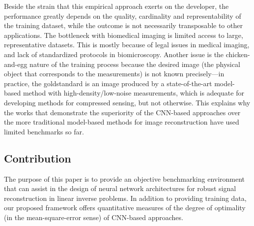 \documentclass[journal]{IEEEtran}
\begin{document}
Beside the strain that this empirical approach exerts on the developer, the performance greatly depends on the quality, cardinality and representability of the
training dataset, while the outcome is not necessarily transposable to other applications. The bottleneck with biomedical imaging is limited access to large, representative datasets. This is mostly because of legal issues in medical imaging, and lack of standardized protocols in biomicroscopy. Another issue is the chicken-and-egg nature of the training process because the desired image (the physical object that corresponds to the measurements) is not known precisely---in practice, the goldstandard is an image produced by a state-of-the-art model-based method with high-density/low-noise measurements, which is adequate for developing methods for compressed sensing, but not otherwise. This explains why the works that demonstrate the superiority of the
CNN-based approaches over the more traditional model-based methods for image reconstruction have used limited benchmarks so far.

\subsection{Contribution}
The purpose of this paper is to provide an objective benchmarking environment 
that can assist in the design of neural network architectures for robust signal reconstruction in linear inverse problems. In addition to providing training data, our proposed framework offers quantitative measures of the degree of optimality (in the mean-square-error sense) of CNN-based approaches.
\end{document}
